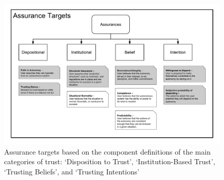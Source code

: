         \begin{figure}
            \includegraphics[width=8in]{Figures/Assurances.pdf}%
            \caption{Assurance targets based on the component definitions of the main categories of trust: `Disposition to Trust', `Institution-Based Trust', `Trusting Beliefs', and `Trusting Intentions'}
            \label{fig:Assurance_classes}
        \end{figure}
